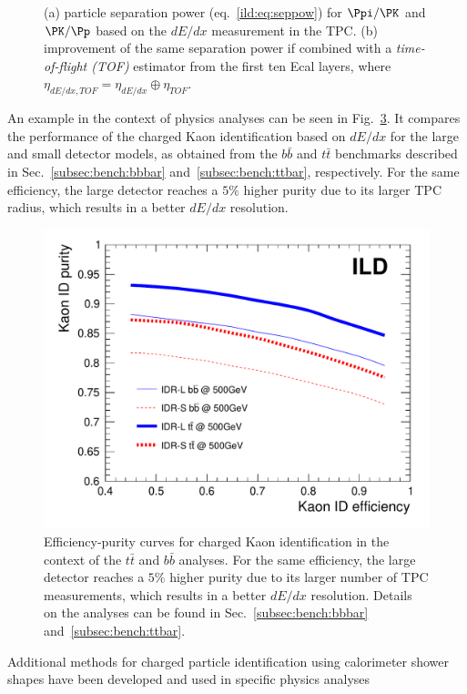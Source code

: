 \begin{figure}[htbp]
\begin{subfigure}{0.49\hsize}
 \caption{  \label{fig:perf:dedxtof_sep}}
 \end{subfigure}
\caption{ (a) particle separation power (eq.~\ref{ild:eq:seppow}) for $\Ppi/\PK$ and $\PK/\Pp$ based on the $dE/dx$ measurement in the TPC.
  (b) improvement of the same separation power if combined with a {\em time-of-flight (TOF)} estimator from the first ten Ecal layers,
  where $\eta_{dE/dx,TOF}=\eta_{dE/dx} \oplus \eta_{TOF}$.
}
\label{fig:perf:dedxtof}
\end{figure}

An example in the context of physics analyses can be seen in Fig.~\ref{fig:perf:KaonID}. It compares the performance of the charged Kaon identification based on $dE/dx$ for the large and small detector models, as obtained from the $b\bar{b}$ and $t\bar{t}$ benchmarks described in Sec.~\ref{subsec:bench:bbbar} and~\ref{subsec:bench:ttbar}, respectively. For the same efficiency, the large detector reaches a $5\%$ higher purity due to its larger TPC radius, which results in a better $dE/dx$ resolution.
\begin{figure}[b!]
  \includegraphics[width=0.8\hsize]{Performance/fig/kaonIDeff_v2-eps-converted-to.pdf}
  \caption{\label{fig:perf:KaonID}
    Efficiency-purity curves for charged Kaon identification in the context of the $t\bar{t}$ and $b\bar{b}$ analyses. For the same
    efficiency, the large detector reaches a $5\%$ higher purity due to its larger number of TPC measurements, which results in a better $dE/dx$
    resolution. Details on the analyses can be found in Sec.~\ref{subsec:bench:bbbar} and~\ref{subsec:bench:ttbar}.
  }
\end{figure}
Additional methods for charged particle identification using calorimeter shower shapes have been developed and used in specific physics analyses~


